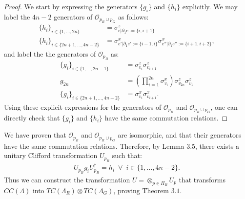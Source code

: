 \documentclass[12pt]{article}
\theoremstyle{definition}
\begin{document}
    \begin{proof}
        We start by expressing the generators $\{g_i\}$ and $\{h_i\}$ explicitly. We may label the $4n-2$ generators of $\mathcal{O}_{p_R\cup p_G}$ as follows:
            \begin{align}
                \{h_i\}_{i\in\{1,...,2n\}} &= \sigma^z_{e|\partial_1e := \{i,i+1\}}\\
                \{h_i\}_{i\in\{2n+1,...,4n-2\}} &= \sigma^x_{e'|\partial_1e' := \{i-1,i\}}\sigma^x_{e''|\partial_1e'' := \{i+1,i+2\}},
            \end{align}
        and label the the generators of $\mathcal{O}_{p_B}$ as:
            \begin{align}
                \{g_i\}_{i\in\{1,...,2n-1\}} &= \sigma^z_{v_i}\sigma^z_{v_{i+1}}\\
                g_{2n} &= (\prod^{2n}_{i = 1}\sigma^x_{v_i})\sigma^z_{v_{2n}}\sigma^z_{v_1}\\
                \{g_i\}_{i\in\{2n+1,...,4n-2\}} &= \sigma^x_{v_i}\sigma^x_{v_{i+1}}.
            \end{align}
        Using these explicit expressions for the generators of $\mathcal{O}_{p_B}$ and $\mathcal{O}_{p_R\cup p_G}$, one can directly check that $\{g_i\}$ and $\{h_i\}$ have the same commutation relations. 
    \end{proof}
We have proven that $\mathcal{O}_{p_B}$ and $\mathcal{O}_{p_R\cup p_G}$ are isomorphic, and that their generators have the same commutation relations. Therefore, by Lemma $3.5$, there exists a unitary Clifford transformation $U_{p_B}$ such that:
    \begin{align}
        U_{p_B}g_iU^\dagger_{p_B} = h_i\enspace\forall\enspace i\in\{1,...,4n-2\}.
    \end{align}
Thus we can construct the transformation $U = \otimes_{p\in\Pi_B}U_p$ that transforms $CC(\Lambda)$ into $TC(\Lambda_R)\otimes TC(\Lambda_G)$, proving Theorem $3.1$.
\end{document}
